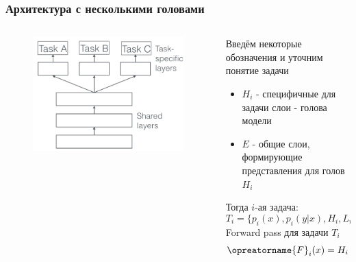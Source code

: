 \documentclass[aspectratio=169]{beamer}
\begin{document}
\begin{frame}
	\frametitle{Архитектура с несколькими головами}
	\begin{columns}
		\begin{column}{0.5\textwidth}
			\begin{figure}
	       		\includegraphics[width=1\textwidth]{assets/multihead_arch.png}
	    	\end{figure}
		\end{column}
		\begin{column}{0.5\textwidth}
			Введём некоторые обозначения и уточним понятие задачи
			\begin{itemize}
				\item $H_i$ - специфичные для задачи слои - голова модели
				\item $E$ - общие слои, формирующие представления для голов $H_i$
			\end{itemize}
			Тогда $i$-ая задача:
			\begin{equation}
				T_i = \{p_i(x), p_i(y | x), H_i, L_i\}
			\end{equation}
			Forward pass для задачи $T_i$
			\begin{equation}
				\opreatorname{F}_i(x) = H_i \circ E \circ x = H_i(E(x))
			\end{equation}
		\end{column}
	\end{columns}
\end{frame}
\end{document}
